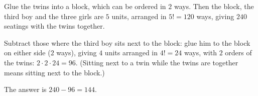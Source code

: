 Glue the twins into a block, which can be ordered in $2$ ways. Then the block, the third boy and the three girls are $5$ units, arranged in $5!=120$ ways, giving $240$ seatings with the twins together.

Subtract those where the third boy sits next to the block: glue him to the block on either side ($2$ ways), giving $4$ units arranged in $4!=24$ ways, with $2$ orders of the twins: $2\cdot2\cdot24=96$. (Sitting next to a twin while the twins are together means sitting next to the block.)

The answer is $240-96=\boxed{144}$.
